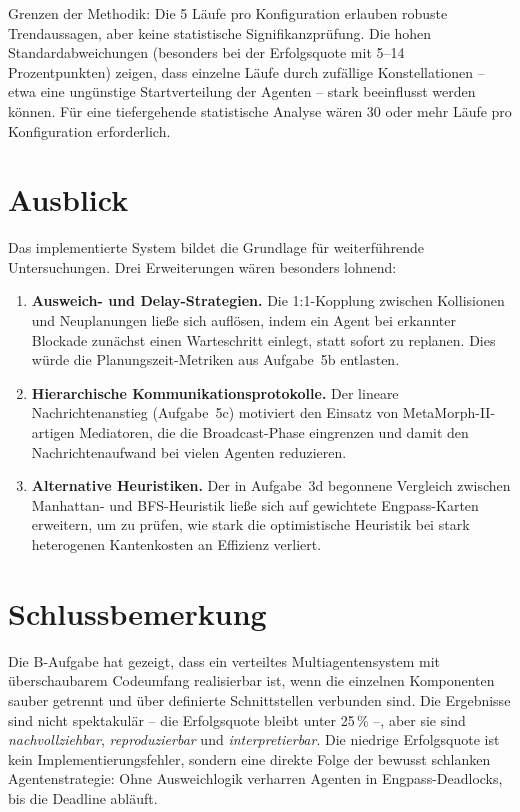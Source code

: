 Grenzen der Methodik: Die 5 Läufe pro Konfiguration erlauben robuste Trendaussagen, aber keine statistische Signifikanzprüfung. Die hohen Standardabweichungen (besonders bei der Erfolgsquote mit 5--14 Prozentpunkten) zeigen, dass einzelne Läufe durch zufällige Konstellationen -- etwa eine ungünstige Startverteilung der Agenten -- stark beeinflusst werden können. Für eine tiefergehende statistische Analyse wären 30 oder mehr Läufe pro Konfiguration erforderlich.

\section{Ausblick}

Das implementierte System bildet die Grundlage für weiterführende Untersuchungen. Drei Erweiterungen wären besonders lohnend:

\begin{enumerate}
    \item \textbf{Ausweich- und Delay-Strategien.} Die 1:1-Kopplung zwischen Kollisionen und Neuplanungen ließe sich auflösen, indem ein Agent bei erkannter Blockade zunächst einen Warteschritt einlegt, statt sofort zu replanen. Dies würde die Planungszeit-Metriken aus Aufgabe~5b entlasten.
    \item \textbf{Hierarchische Kommunikationsprotokolle.} Der lineare Nachrichtenanstieg (Aufgabe~5c) motiviert den Einsatz von MetaMorph-II-artigen Mediatoren, die die Broadcast-Phase eingrenzen und damit den Nachrichtenaufwand bei vielen Agenten reduzieren.
    \item \textbf{Alternative Heuristiken.} Der in Aufgabe~3d begonnene Vergleich zwischen Manhattan- und \acs{BFS}-Heuristik ließe sich auf gewichtete Engpass-Karten erweitern, um zu prüfen, wie stark die optimistische Heuristik bei stark heterogenen Kantenkosten an Effizienz verliert.
\end{enumerate}

\section{Schlussbemerkung}

Die B-Aufgabe hat gezeigt, dass ein verteiltes Multiagentensystem mit überschaubarem Codeumfang realisierbar ist, wenn die einzelnen Komponenten sauber getrennt und über definierte Schnittstellen verbunden sind. Die Ergebnisse sind nicht spektakulär -- die Erfolgsquote bleibt unter 25\,\% --, aber sie sind \textit{nachvollziehbar}, \textit{reproduzierbar} und \textit{interpretierbar}. Die niedrige Erfolgsquote ist kein Implementierungsfehler, sondern eine direkte Folge der bewusst schlanken Agentenstrategie: Ohne Ausweichlogik verharren Agenten in Engpass-Deadlocks, bis die Deadline abläuft.

